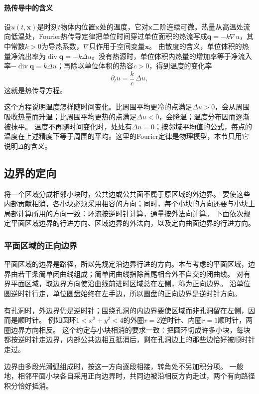 \paragraph{热传导中的含义}

设$u(t,\bm x)$是时刻$t$物体内位置$\bm x$处的温度，它对$\bm x$二阶连续可微。热量从高温处流向低温处，Fourier热传导定律把单位时间穿过单位面积的热流写成$\bm q=-k\nabla u$，其中常数$k>0$为导热系数，$\nabla$只作用于空间变量$\bm x$。
由散度的含义，单位体积的热量净流出率为$\operatorname{div}\bm q=-k\Delta u$。没有热源时，单位体积内热量的增加率等于净流入率$-\operatorname{div}\bm q=k\Delta u$；再除以单位体积的热容$c>0$，得到温度的变化率
\[
 \partial_tu=\frac kc\,\Delta u,
\]
这就是热传导方程。

这个方程说明温度怎样随时间变化。比周围平均更冷的点满足$\Delta u>0$，会从周围吸收热量而升温；比周围平均更热的点满足$\Delta u<0$，会降温；温度分布因而逐渐被抹平。
温度不再随时间变化时，处处有$\Delta u=0$；按邻域平均值的公式，每点的温度在上述精度下等于周围的平均。这里的Fourier定律是物理模型，本节只用它说明$\Delta$的含义。

\subsection{边界的定向}

将一个区域分成相邻小块时，公共边或公共面不属于原区域的外边界。
要使这些内部贡献相消，各小块必须采用相容的方向；同时，每个小块的方向还要与小块上局部计算所用的方向一致：环流按逆时针计算，通量按外法向计算。
下面依次规定平面区域边界的行进方向、区域边界的外法向，以及定向曲面边界的行进方向。

\subsubsection{平面区域的正向边界}

平面区域的边界是路径，所以先规定沿边界行进的方向。本节考虑的平面区域，边界由若干条简单闭曲线组成；简单闭曲线指除首尾相合外不自交的闭曲线。
对有界平面区域，取边界方向使沿曲线前进时区域总在左侧，称为正向边界。
沿单位圆逆时针行走，单位圆盘始终在左手边，所以圆盘的正向边界是逆时针方向。

有孔洞时，外边界仍是逆时针；围绕孔洞的内边界要使区域而非孔洞留在左侧，因而是顺时针。
例如圆环$1<x^2+y^2<4$的外圈$r=2$逆时针、内圈$r=1$顺时针，两圈边界方向相反。
这个约定与小块相消的要求一致：把圆环切成许多小块，每块都按逆时针走边界，内部公共边相互抵消后，剩在孔洞边上的那些边恰好被顺时针走过。

边界由多段光滑弧组成时，按这一方向逐段相接，转角处不另加积分项。
一般地，相邻平面小块各自采用正向边界时，共同边被沿相反方向走过，两个有向路径积分恰好抵消。

